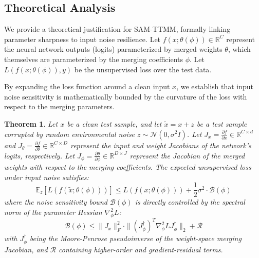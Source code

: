 \documentclass{article}
\theoremstyle{plain}
\newtheorem{theorem}{Theorem}[section]
\theoremstyle{definition}
\theoremstyle{remark}
\begin{document}
\subsection{Theoretical Analysis}
We provide a theoretical justification for SAM-TTMM, formally linking parameter sharpness to input noise resilience.
Let $f(x; \theta(\phi)) \in \mathbb{R}^C$ represent the neural network outputs (logits) parameterized by merged weights $\theta$, which themselves are parameterized by the merging coefficients $\phi$. Let $L(f(x; \theta(\phi)), y)$ be the unsupervised loss over the test data.

By expanding the loss function around a clean input $x$, we establish that input noise sensitivity is mathematically bounded by the curvature of the loss with respect to the merging parameters.

\begin{theorem}
Let $x$ be a clean test sample, and let $\tilde{x} = x + z$ be a test sample corrupted by random environmental noise $z \sim \mathcal{N}(0, \sigma^2 I)$. Let $J_x = \frac{\partial f}{\partial x} \in \mathbb{R}^{C \times d}$ and $J_\theta = \frac{\partial f}{\partial \theta} \in \mathbb{R}^{C \times D}$ represent the input and weight Jacobians of the network's logits, respectively. Let $J_\phi = \frac{\partial \theta}{\partial \phi} \in \mathbb{R}^{D \times J}$ represent the Jacobian of the merged weights with respect to the merging coefficients.
The expected unsupervised loss under input noise satisfies:
\begin{equation}
    \mathbb{E}_z [L(f(\tilde{x}; \theta(\phi)))] \le L(f(x; \theta(\phi))) + \frac{1}{2} \sigma^2 \cdot \mathcal{B}(\phi)
\end{equation}
where the noise sensitivity bound $\mathcal{B}(\phi)$ is directly controlled by the spectral norm of the parameter Hessian $\nabla_\phi^2 L$:
\begin{equation}
    \mathcal{B}(\phi) \le \|J_x\|_F^2 \cdot \|(J_\phi^\dagger)^T \nabla_\phi^2 L J_\phi^\dagger\|_2 + \mathcal{R}
\end{equation}
with $J_\phi^\dagger$ being the Moore-Penrose pseudoinverse of the weight-space merging Jacobian, and $\mathcal{R}$ containing higher-order and gradient-residual terms.
\end{theorem}
\end{document}
